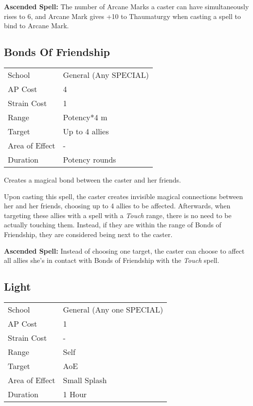 \documentclass[11pt,a4paper,twocolumn]{book}
\begin{document}
\bigskip

\textbf{Ascended Spell:} The number of Arcane Marks a caster can have simultaneously rises to 6, and Arcane Mark gives +10 to Thaumaturgy when casting a spell to bind to Arcane Mark. 

\medskip

\subsection*{Bonds Of Friendship}

{
	\begin{tabu} to 75mm{| X[l,4] | X[l,7] |}
		\hline
		School 			& General (Any SPECIAL) 	\\
		AP Cost	      	& 4 					\\
		Strain Cost     & 1 					\\
		Range     		& Potency*4 m 			\\
		Target      	& Up to 4 allies			\\
		Area of Effect  & - 	 				\\
		Duration     	& Potency rounds 		\\ \hline
	\end{tabu}
	
}

\medskip

Creates a magical bond between the caster and her friends.

Upon casting this spell, the caster creates invisible magical connections between her and her friends, choosing up to 4 allies to be affected. Afterwards, when targeting these allies with a spell with a \textit{Touch} range, there is no need to be actually touching them. Instead, if they are within the range of Bonds of Friendship, they are considered being next to the caster.

\bigskip

\textbf{Ascended Spell:} Instead of choosing one target, the caster can choose to affect all allies she's in contact with Bonds of Friendship with the \textit{Touch} spell.


\subsection*{Light}
{
	\begin{tabu} to 75mm{| X[l,4] | X[l,7] |}
		\hline
		School 			& General (Any one SPECIAL) 		\\
		AP Cost	      	& 1 								\\
		Strain Cost     & - 								\\
		Range     		& Self 								\\
		Target      	& AoE								\\
		Area of Effect  & Small Splash  	 					\\
		Duration     	& 1 Hour							\\ \hline
	\end{tabu}
	
}
\end{document}
